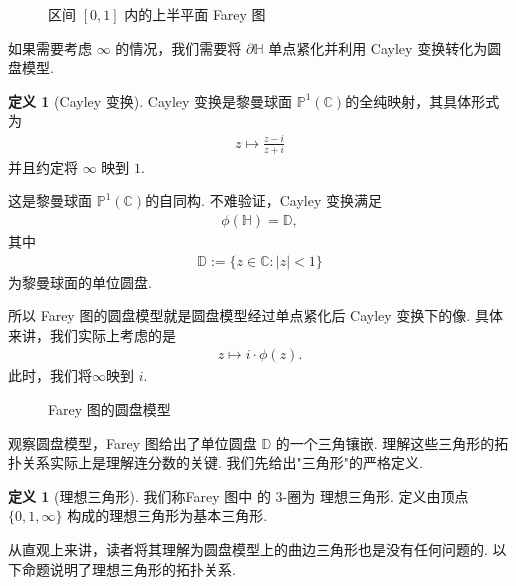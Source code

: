 \documentclass[10pt,UTF8]{ctexart}
\renewcommand{\P}{\mathbb{P}}
\newcommand{\C}{\mathbb{C}}
\newcommand{\D}{\mathbb{D}}
\newcommand{\HH}{\mathbb{H}} %
\theoremstyle{definition}
\newtheorem{definition}[theorem]{定义}
\theoremstyle{remark}
\begin{document}
\begin{figure}[H]
    \centering
    \caption{区间 $[0,1]$ 内的上半平面 Farey 图}
    \label{fig:farey_uhp}
\end{figure}

如果需要考虑 $\infty$ 的情况，我们需要将 $\partial \HH$ 单点紧化并利用 Cayley 变换转化为圆盘模型. 
\begin{definition}[Cayley 变换]
    Cayley 变换是黎曼球面 $\P^1(\C)$的全纯映射，其具体形式为 
    \begin{align*}
        z \mapsto  \frac{z-i}{z+i}
    \end{align*}
    并且约定将 $\infty$ 映到 $1$.
\end{definition}
这是黎曼球面 $\P^1(\C)$的自同构. 
不难验证，Cayley 变换满足
\begin{align*}
    \phi(\HH) = \D, 
\end{align*}
其中
\begin{align*}
    \D:= \{z\in\C: |z|<1\}
\end{align*}
为黎曼球面的单位圆盘. 

所以 Farey 图的圆盘模型就是圆盘模型经过单点紧化后 Cayley 变换下的像. 具体来讲，我们实际上考虑的是 
\begin{align*}
    z\mapsto i\cdot\phi(z).
\end{align*}
此时，我们将$\infty$映到 $i$. 

\begin{figure}[H]
    \centering
    \caption{Farey 图的圆盘模型}
    \label{fig:farey_disk}
\end{figure}





观察圆盘模型，Farey 图给出了单位圆盘 $\D$ 的一个三角镶嵌.
理解这些三角形的拓扑关系实际上是理解连分数的关键. 
我们先给出"三角形"的严格定义. 
\begin{definition}[理想三角形]
    我们称Farey 图中 的 $3$-圈为 理想三角形. 定义由顶点 $\{0,1,\infty\}$ 构成的理想三角形为基本三角形.
\end{definition}

从直观上来讲，读者将其理解为圆盘模型上的曲边三角形也是没有任何问题的. 
以下命题说明了理想三角形的拓扑关系. 
\end{document}
